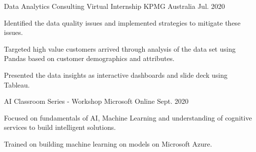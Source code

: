 


\begin{cventries}


\cventry
{Data Analytics Consulting Virtual Internship} %
{KPMG} %
{Australia} %
{Jul. 2020} %
{ %
\begin{cvitems}
\item {Identified the data quality issues and implemented strategies to mitigate these issues.}
\item {Targeted high value customers arrived through analysis of the data set using Pandas based on customer demographics and attributes.}
\item {Presented the data insights as interactive dashboards and slide deck using Tableau.}
\end{cvitems}
}


\cventry
{AI Classroom Series - Workshop} %
{Microsoft} %
{Online} %
{Sept. 2020} %
{ %
\begin{cvitems}
\item {Focused on fundamentals of AI, Machine Learning and understanding of cognitive services to build intelligent solutions.}
\item {Trained on building machine learning on models on Microsoft Azure.}
\end{cvitems}
}











\end{cventries}
